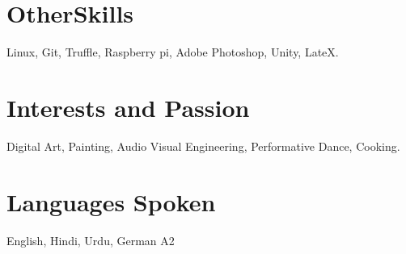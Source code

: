 \section*{OtherSkills} 

{Linux, Git, Truffle, Raspberry pi, Adobe Photoshop, Unity, LateX.}

\section*{Interests and Passion}

{Digital Art, Painting, Audio Visual Engineering, Performative Dance, Cooking.}

\section*{Languages Spoken}

{English, Hindi, Urdu, German A2}